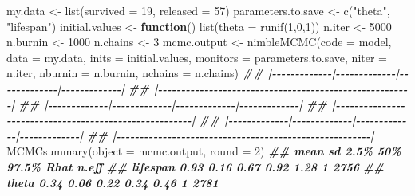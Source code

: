 \documentclass[
  12pt,
]{krantz}
\newenvironment{Shaded}{\begin{snugshade}}{\end{snugshade}}
\newcommand{\AttributeTok}[1]{\textcolor[rgb]{0.77,0.63,0.00}{#1}}
\newcommand{\ControlFlowTok}[1]{\textcolor[rgb]{0.13,0.29,0.53}{\textbf{#1}}}
\newcommand{\DecValTok}[1]{\textcolor[rgb]{0.00,0.00,0.81}{#1}}
\newcommand{\DocumentationTok}[1]{\textcolor[rgb]{0.56,0.35,0.01}{\textbf{\textit{#1}}}}
\newcommand{\FunctionTok}[1]{\textcolor[rgb]{0.00,0.00,0.00}{#1}}
\newcommand{\NormalTok}[1]{#1}
\newcommand{\OtherTok}[1]{\textcolor[rgb]{0.56,0.35,0.01}{#1}}
\newcommand{\StringTok}[1]{\textcolor[rgb]{0.31,0.60,0.02}{#1}}
\begin{document}
\begin{Shaded}
\begin{Highlighting}[]
\NormalTok{my.data }\OtherTok{\textless{}{-}} \FunctionTok{list}\NormalTok{(}\AttributeTok{survived =} \DecValTok{19}\NormalTok{, }\AttributeTok{released =} \DecValTok{57}\NormalTok{)}
\NormalTok{parameters.to.save }\OtherTok{\textless{}{-}} \FunctionTok{c}\NormalTok{(}\StringTok{"theta"}\NormalTok{, }\StringTok{"lifespan"}\NormalTok{)}
\NormalTok{initial.values }\OtherTok{\textless{}{-}} \ControlFlowTok{function}\NormalTok{() }\FunctionTok{list}\NormalTok{(}\AttributeTok{theta =} \FunctionTok{runif}\NormalTok{(}\DecValTok{1}\NormalTok{,}\DecValTok{0}\NormalTok{,}\DecValTok{1}\NormalTok{))}
\NormalTok{n.iter }\OtherTok{\textless{}{-}} \DecValTok{5000}
\NormalTok{n.burnin }\OtherTok{\textless{}{-}} \DecValTok{1000}
\NormalTok{n.chains }\OtherTok{\textless{}{-}} \DecValTok{3}
\NormalTok{mcmc.output }\OtherTok{\textless{}{-}} \FunctionTok{nimbleMCMC}\NormalTok{(}\AttributeTok{code =}\NormalTok{ model,}
                          \AttributeTok{data =}\NormalTok{ my.data,}
                          \AttributeTok{inits =}\NormalTok{ initial.values,}
                          \AttributeTok{monitors =}\NormalTok{ parameters.to.save,}
                          \AttributeTok{niter =}\NormalTok{ n.iter,}
                          \AttributeTok{nburnin =}\NormalTok{ n.burnin,}
                          \AttributeTok{nchains =}\NormalTok{ n.chains)}
\DocumentationTok{\#\# |{-}{-}{-}{-}{-}{-}{-}{-}{-}{-}{-}{-}{-}|{-}{-}{-}{-}{-}{-}{-}{-}{-}{-}{-}{-}{-}|{-}{-}{-}{-}{-}{-}{-}{-}{-}{-}{-}{-}{-}|{-}{-}{-}{-}{-}{-}{-}{-}{-}{-}{-}{-}{-}|}
\DocumentationTok{\#\# |{-}{-}{-}{-}{-}{-}{-}{-}{-}{-}{-}{-}{-}{-}{-}{-}{-}{-}{-}{-}{-}{-}{-}{-}{-}{-}{-}{-}{-}{-}{-}{-}{-}{-}{-}{-}{-}{-}{-}{-}{-}{-}{-}{-}{-}{-}{-}{-}{-}{-}{-}{-}{-}{-}{-}|}
\DocumentationTok{\#\# |{-}{-}{-}{-}{-}{-}{-}{-}{-}{-}{-}{-}{-}|{-}{-}{-}{-}{-}{-}{-}{-}{-}{-}{-}{-}{-}|{-}{-}{-}{-}{-}{-}{-}{-}{-}{-}{-}{-}{-}|{-}{-}{-}{-}{-}{-}{-}{-}{-}{-}{-}{-}{-}|}
\DocumentationTok{\#\# |{-}{-}{-}{-}{-}{-}{-}{-}{-}{-}{-}{-}{-}{-}{-}{-}{-}{-}{-}{-}{-}{-}{-}{-}{-}{-}{-}{-}{-}{-}{-}{-}{-}{-}{-}{-}{-}{-}{-}{-}{-}{-}{-}{-}{-}{-}{-}{-}{-}{-}{-}{-}{-}{-}{-}|}
\DocumentationTok{\#\# |{-}{-}{-}{-}{-}{-}{-}{-}{-}{-}{-}{-}{-}|{-}{-}{-}{-}{-}{-}{-}{-}{-}{-}{-}{-}{-}|{-}{-}{-}{-}{-}{-}{-}{-}{-}{-}{-}{-}{-}|{-}{-}{-}{-}{-}{-}{-}{-}{-}{-}{-}{-}{-}|}
\DocumentationTok{\#\# |{-}{-}{-}{-}{-}{-}{-}{-}{-}{-}{-}{-}{-}{-}{-}{-}{-}{-}{-}{-}{-}{-}{-}{-}{-}{-}{-}{-}{-}{-}{-}{-}{-}{-}{-}{-}{-}{-}{-}{-}{-}{-}{-}{-}{-}{-}{-}{-}{-}{-}{-}{-}{-}{-}{-}|}
\FunctionTok{MCMCsummary}\NormalTok{(}\AttributeTok{object =}\NormalTok{ mcmc.output, }\AttributeTok{round =} \DecValTok{2}\NormalTok{)}
\DocumentationTok{\#\#          mean   sd 2.5\%  50\% 97.5\% Rhat n.eff}
\DocumentationTok{\#\# lifespan 0.93 0.16 0.67 0.92  1.28    1  2756}
\DocumentationTok{\#\# theta    0.34 0.06 0.22 0.34  0.46    1  2781}
\end{Highlighting}
\end{Shaded}
\end{document}
